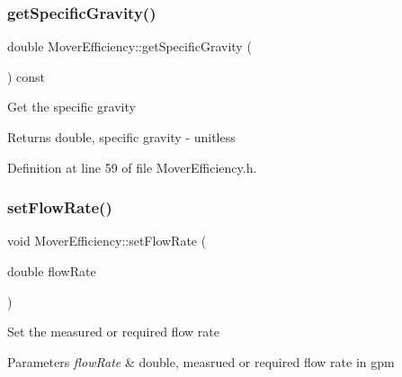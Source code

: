 \mbox{\label{class_mover_efficiency_a4acdd89fec01daef4902238202e00884}} 
\subsubsection{\texorpdfstring{get\+Specific\+Gravity()}{getSpecificGravity()}\hspace{0.1cm}{\footnotesize\ttfamily [3/3]}}
{\footnotesize\ttfamily double Mover\+Efficiency\+::get\+Specific\+Gravity (\begin{DoxyParamCaption}{ }\end{DoxyParamCaption}) const\hspace{0.3cm}{\ttfamily [inline]}}

Get the specific gravity \begin{DoxyReturn}{Returns}
double, specific gravity -\/ unitless 
\end{DoxyReturn}


Definition at line 59 of file Mover\+Efficiency.\+h.

\mbox{\label{class_mover_efficiency_a35bf328fcd7e8334d552bce8b8704379}} 
\subsubsection{\texorpdfstring{set\+Flow\+Rate()}{setFlowRate()}\hspace{0.1cm}{\footnotesize\ttfamily [1/3]}}
{\footnotesize\ttfamily void Mover\+Efficiency\+::set\+Flow\+Rate (\begin{DoxyParamCaption}\item[{double}]{flow\+Rate }\end{DoxyParamCaption})\hspace{0.3cm}{\ttfamily [inline]}}

Set the measured or required flow rate 
\begin{DoxyParams}{Parameters}
{\em flow\+Rate} & double, measrued or required flow rate in gpm \\
\hline
\end{DoxyParams}


